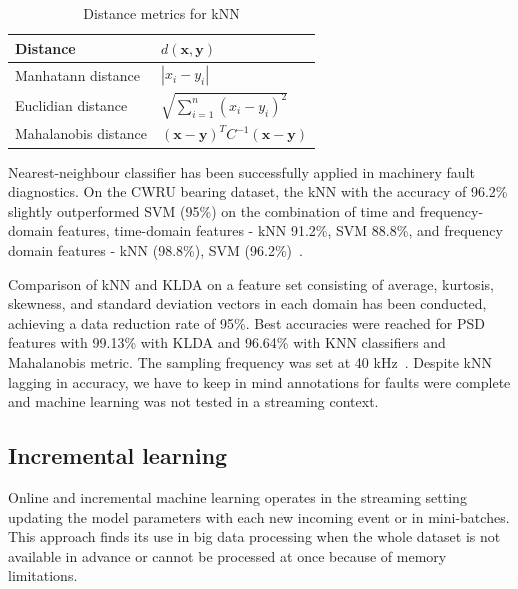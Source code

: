 \begin{table}[ht]
\centering
\renewcommand{\arraystretch}{2}
\begin{tabular}{|l|l|}
\hline
\textbf{Distance}     & \textbf{$d(\mathbf{x}, \mathbf{y})$}                                   \\ \hline
Manhatann distance	 & $ |x_i - y_i| $													   \\ \hline
Euclidian distance    & $ \sqrt{\sum_{i = 1}^{n}(x_i - y_i)^2} $                               \\ \hline
Mahalanobis distance  & $ (\mathbf{x} - \mathbf{y})^T C^{-1} (\mathbf{x} - \mathbf{y}) $       \\ \hline
\end{tabular}
\caption{Distance metrics for kNN}
\label{tab:knn-distance}
\end{table}

Nearest-neighbour classifier has been successfully applied in machinery fault diagnostics. On the CWRU bearing dataset, the kNN with the accuracy of 96.2\% slightly outperformed SVM (95\%) on the combination of time and frequency-domain features, time-domain features - kNN 91.2\%, SVM 88.8\%, and frequency domain features - kNN (98.8\%), SVM (96.2\%)~\cite{jamil_feature-based_2021}. 

Comparison of kNN and KLDA on a feature set consisting of average, kurtosis, skewness, and standard deviation vectors in each domain has been conducted, achieving a data reduction rate of 95\%. Best accuracies were reached for PSD features with 99.13\% with KLDA and 96.64\% with KNN classifiers and Mahalanobis metric. The sampling frequency was set at 40 kHz~\cite{altaf_new_2022}. Despite kNN lagging in accuracy, we have to keep in mind annotations for faults were complete and machine learning was not tested in a streaming context.

\subsection{Incremental learning}
Online and incremental machine learning operates in the streaming setting updating the model parameters with each new incoming event or in mini-batches. This approach finds its use in big data processing when the whole dataset is not available in advance or cannot be processed at once because of memory limitations. 

